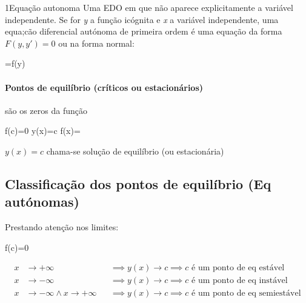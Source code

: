 \documentclass["AM3C-Slides_annotations.tex"]{subfiles}
\begin{document}
\begin{sectionBox}1{Equação autonoma} %
  Uma EDO em que não aparece explicitamente a variável independente.
  Se for \textit{y} a função icógnita e \textit{x} a variável independente, uma equa;cão diferencial autónoma de primeira ordem é uma equação da forma \(F(y,y')=0\) ou na forma normal:
  \begin{BM}
    =f(y)
  \end{BM}
  \paragraph*{Pontos de equilíbrio (críticos ou estacionários)} são os zeros da função 
  \begin{BM}
    f(c)=0 \implies y(x)=c  f(x)=
  \end{BM}
  \(y(x)=c\) chama-se solução de equilíbrio (ou estacionária)


  \subsection*{Classificação dos pontos de equilíbrio (Eq autónomas)}
  Prestando atenção nos limites:
  \begin{BM}
    f(c)=0
  \end{BM}
  \begin{align*}
       x &\to +\infty          && \implies y(x) \to c \implies c \text{ é um ponto de eq estável}
    \\ x &\to -\infty          && \implies y(x) \to c \implies c \text{ é um ponto de eq instável}
    \\ x &\to -\infty \land x \to +\infty && \implies y(x) \to c \implies c \text{ é um ponto de eq semiestável}
  \end{align*}
\end{sectionBox}
\end{document}
